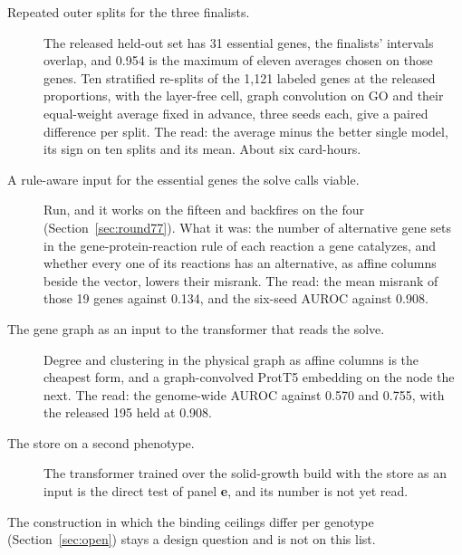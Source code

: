 \begin{description}
  \item[Repeated outer splits for the three finalists.] The released held-out set has 31
    essential genes, the finalists' intervals overlap, and 0.954 is the maximum of
    eleven averages chosen on those genes. Ten stratified re-splits of the 1,121 labeled
    genes at the released proportions, with the layer-free cell, graph convolution on GO
    and their equal-weight average fixed in advance, three seeds each, give a paired
    difference per split. The read: the average minus the better single model, its sign
    on ten splits and its mean. About six card-hours.
  \item[A rule-aware input for the essential genes the solve calls viable.] Run, and
    it works on the fifteen and backfires on the four
    (Section~\ref{sec:round77}). What it was: the number of alternative gene
    sets in the gene-protein-reaction rule of each reaction a gene catalyzes, and
    whether every one of its reactions has an alternative, as affine columns beside the
    vector, lowers their misrank. The read: the mean misrank of those 19 genes against
    0.134, and the six-seed AUROC against 0.908.
  \item[The gene graph as an input to the transformer that reads the solve.] Degree
    and clustering in the physical graph as affine columns is the cheapest form, and a
    graph-convolved ProtT5 embedding on the node the next. The read: the genome-wide
    AUROC against 0.570 and 0.755, with the released 195 held at 0.908.
  \item[The store on a second phenotype.] The transformer trained over the solid-growth
    build with the store as an input is the direct test of panel \textbf{e}, and its
    number is not yet read.
\end{description}

The construction in which the binding ceilings differ per genotype
(Section~\ref{sec:open}) stays a design question and is not on this list.
